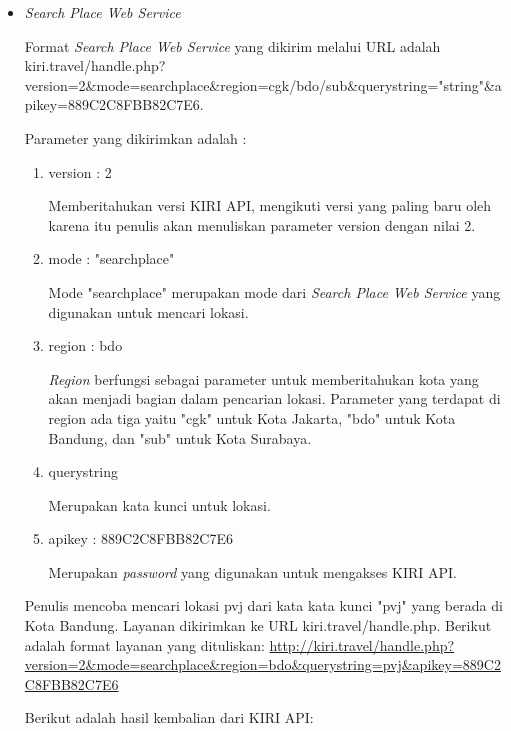 \begin{itemize}
	\item \textit{Search Place Web Service}
	
	Format \textit{Search Place Web Service} yang dikirim melalui URL adalah kiri.travel/handle.php?version=2\&mode=searchplace\&region=cgk/bdo/sub\&querystring="string"\&apikey=889C2C8FBB82C7E6.
	
	Parameter yang dikirimkan adalah :
	
	\begin{enumerate}
		\item version : 2
		
		Memberitahukan versi KIRI API, mengikuti versi yang paling baru oleh karena itu penulis akan menuliskan parameter version dengan nilai 2.
		\item mode : "searchplace"
		
		Mode "searchplace" merupakan mode dari \textit{Search Place Web Service} yang digunakan untuk mencari lokasi.
		\item region : bdo
		
		\textit{Region} berfungsi sebagai parameter untuk memberitahukan kota yang akan menjadi bagian dalam pencarian lokasi. Parameter yang terdapat di region ada tiga yaitu "cgk" untuk Kota Jakarta, "bdo" untuk Kota Bandung, dan "sub" untuk Kota Surabaya.
		\item querystring
		
		Merupakan kata kunci untuk lokasi.
		\item apikey : 889C2C8FBB82C7E6
		
		Merupakan \textit{password} yang digunakan untuk mengakses KIRI API.
	\end{enumerate}
	
	Penulis mencoba mencari lokasi pvj dari kata kata kunci "pvj" yang berada di Kota Bandung. Layanan dikirimkan ke URL kiri.travel/handle.php. Berikut adalah format layanan yang dituliskan: \url{http://kiri.travel/handle.php?version=2\&mode=searchplace\&region=bdo\&querystring=pvj\&apikey=889C2C8FBB82C7E6}
	
	Berikut adalah hasil kembalian dari KIRI API:
	

\end{itemize}
